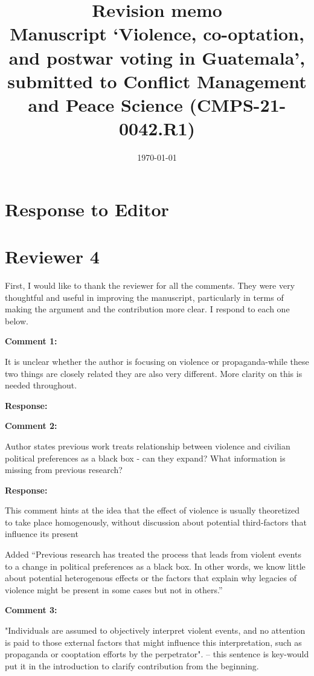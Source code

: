 \documentclass[12pt, a4paper, notitlepage]{article}
\title{\large \textbf{Revision memo}\\{\normalsize Manuscript `Violence, co-optation, and postwar voting in Guatemala', submitted to Conflict Management and Peace Science (CMPS-21-0042.R1)}}
\author{}
\date{\today}
\begin{document}
\maketitle

\section*{Response to Editor}

\newpage
\section*{Reviewer 4}

First, I would like to thank the reviewer for all the comments. They were very thoughtful and useful in improving the manuscript, particularly in terms of making the argument and the contribution more clear. I respond to each one below.

\vspace{15pt}
\noindent\textbf{Comment 1:}
\begin{displayquote}
It is unclear whether the author is focusing on violence or propaganda-while these two things are closely related they are also very different. More clarity on this is needed throughout.
\end{displayquote}

\noindent\textbf{Response:}


\vspace{15pt}
\noindent\textbf{Comment 2:}
\begin{displayquote}
Author states previous work treats relationship between violence and civilian political preferences as a black box - can they expand? What information is missing from previous research?
\end{displayquote}

\noindent\textbf{Response:}

This comment hints at the idea that the effect of violence is usually theoretized to take place homogenously, without discussion about potential third-factors that influence its present

Added ``Previous research has treated the process that leads from violent events to a change in political preferences as a black box. In other words, we know little about potential heterogenous effects or the factors that explain why legacies of violence might be present in some cases but not in others.''


\vspace{15pt}
\noindent\textbf{Comment 3:}
\begin{displayquote}
"Individuals are assumed to objectively interpret violent events, and no attention is paid to those external factors that might influence this interpretation, such as propaganda or cooptation efforts by the perpetrator". -- this sentence is key-would put it in the introduction to clarify contribution from the beginning.
\end{displayquote}
\end{document}
